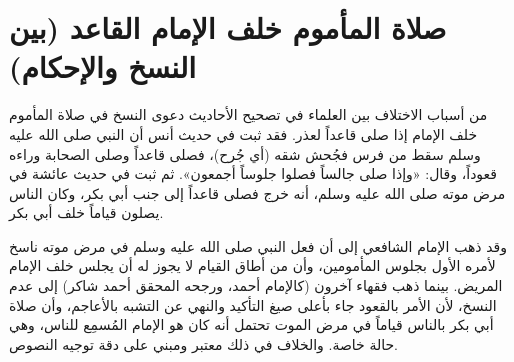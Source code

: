 \section{صلاة المأموم خلف الإمام القاعد (بين النسخ والإحكام)}
من أسباب الاختلاف بين العلماء في تصحيح الأحاديث دعوى النسخ في صلاة المأموم خلف الإمام إذا صلى قاعداً لعذر.
فقد ثبت في حديث أنس أن النبي صلى الله عليه وسلم سقط من فرس فجُحش شقه (أي جُرح)، فصلى قاعداً وصلى الصحابة وراءه قعوداً، وقال: «وإذا صلى جالساً فصلوا جلوساً أجمعون».
ثم ثبت في حديث عائشة في مرض موته صلى الله عليه وسلم، أنه خرج فصلى قاعداً إلى جنب أبي بكر، وكان الناس يصلون قياماً خلف أبي بكر.

وقد ذهب الإمام الشافعي إلى أن فعل النبي صلى الله عليه وسلم في مرض موته ناسخ لأمره الأول بجلوس المأمومين، وأن من أطاق القيام لا يجوز له أن يجلس خلف الإمام المريض.
بينما ذهب فقهاء آخرون (كالإمام أحمد، ورجحه المحقق أحمد شاكر) إلى عدم النسخ، لأن الأمر بالقعود جاء بأعلى صيغ التأكيد والنهي عن التشبه بالأعاجم، وأن صلاة أبي بكر بالناس قياماً في مرض الموت تحتمل أنه كان هو الإمام المُسمِع للناس، وهي حالة خاصة. والخلاف في ذلك معتبر ومبني على دقة توجيه النصوص.